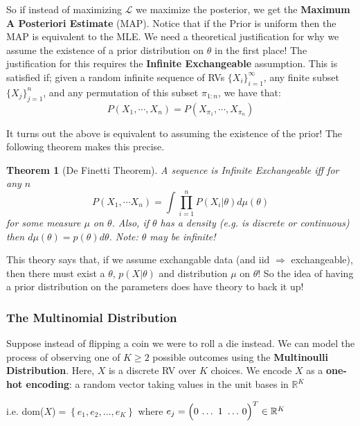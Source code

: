 \documentclass[]{article}
\theoremstyle{mattstyle}
\newtheorem{theorem}{Theorem}[section]
\theoremstyle{definition}
\begin{document}
So if instead of maximizing $\mathcal{L}$ we maximize the posterior, we get the \textbf{Maximum A Posteriori Estimate} (MAP). Notice that if the Prior is uniform then the MAP is equivalent to the MLE. We need a theoretical justification for why we assume the existence of a prior distribution on \(\theta\) in the first place! The justification for this requires the \textbf{Infinite Exchangeable} assumption. This is satisfied if; given a random infinite sequence of RVs \( \{X_i\}_{i=1}^{\infty}\), any finite subset \(\{X_j\}_{j=1}^{n}\), and any permutation of this subset \(\pi_{1:n}\), we have that:
\begin{equation}
P(X_1, \cdots, X_n) = P(X_{\pi_1}, \cdots, X_{\pi_n})
\end{equation}

It turns out the above is equivalent to assuming the existence of the prior! The following theorem makes this precise.

\begin{theorem}[De Finetti Theorem]
	A sequence is Infinite Exchangeable iff for any \(n\)
	$$ P(X_1, \cdots X_n) = \int\prod_{i=1}^n P(X_i|\theta)d\mu(\theta) $$
	for some measure \(\mu\) on \(\theta\). Also, if $\theta$ has a density (e.g. is discrete or continuous) then $d\mu(\theta) = p(\theta)d\theta$. Note: \(\theta\) may be infinite!
\end{theorem}

This theory says that, if we assume exchangable data (and iid $\Rightarrow$ exchangeable), then there must exist a \(\theta\), \(p(X|\theta)\) and distribution \(\mu\) on \(\theta\)! So the idea of having a prior distribution on the parameters does have theory to back it up!

\subsubsection{The Multinomial Distribution}

Suppose instead of flipping a coin we were to roll a die instead. We can model the process of observing one of $K \ge 2$ possible outcomes using the \textbf{Multinoulli Distribution}. Here, $X$ is a discrete RV over $K$ choices. We encode $X$ as a \textbf{one-hot encoding}: a random vector taking values in the unit bases in $\mathbb{R}^{K}$ 

i.e. dom($X$)\(= \left\{e_{1}, e_{2}, \ldots, e_{K}\right\}\) where \(e_{j} = \left(0\,\ldots\tikz[remember picture,baseline]{\node[anchor=base] (one-hot-1) {$1$};}\ldots\,0\right)^{T} \in \mathbb{R}^{K}\)
\end{document}
